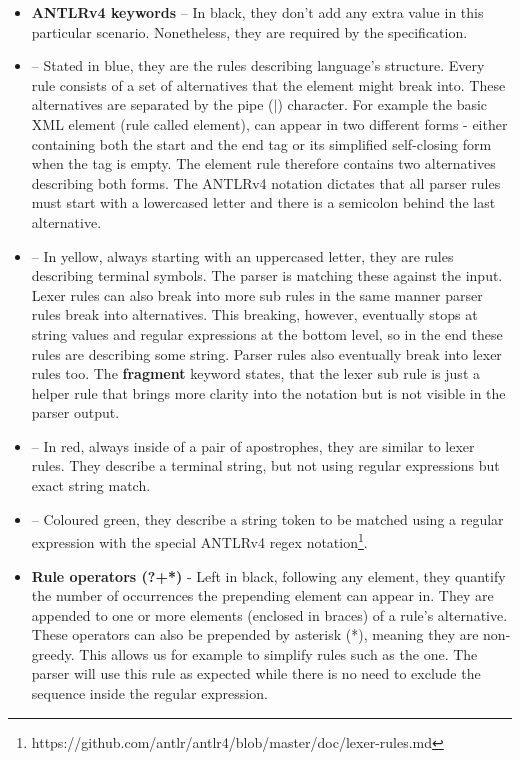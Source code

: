 \begin{itemize}
	\item \textbf{ANTLRv4 keywords} -- In black, they don't add any extra value in this particular scenario. Nonetheless, they are required by the specification.
	
	\item {} -- Stated in blue, they are the rules describing language's structure. Every rule consists of a set of alternatives that the element might break into. These alternatives are separated by the pipe ($|$) character. For example the basic XML element (rule called element), can appear in two different forms - either containing both the start and the end tag or its simplified self-closing form when the tag is empty. The element rule therefore contains two alternatives describing both forms. The ANTLRv4 notation dictates that all parser rules must start with a lowercased letter and there is a semicolon behind the last alternative.
	
	\item {} -- In yellow, always starting with an uppercased letter, they are rules describing terminal symbols. The parser is matching these against the input. Lexer rules can also break into more sub rules in the same manner parser rules break into alternatives. This breaking, however, eventually stops at string values and regular expressions at the bottom level, so in the end these rules are describing some string. Parser rules also eventually break into lexer rules too. The \textbf{fragment} keyword states, that the lexer sub rule is just a helper rule that brings more clarity into the notation but is not visible in the parser output.
	
	\item {} -- In red, always inside of a pair of apostrophes, they are similar to lexer rules. They describe a terminal string, but not using regular expressions but exact string match.
	
	\item {} -- Coloured green, they describe a string token to be matched using a regular expression with the special ANTLRv4 regex notation\footnote{https://github.com/antlr/antlr4/blob/master/doc/lexer-rules.md}.
	
	\item \textbf{Rule operators (?+*)} - Left in black, following any element, they quantify the number of occurrences the prepending element can appear in. They are appended to one or more elements (enclosed in braces) of a rule's alternative. These operators can also be prepended by asterisk (*), meaning they are non-greedy. This allows us for example to simplify rules such as the  one. The parser will use this rule as expected while there is no need to exclude the \literal{\texttt{]]>}} sequence inside the regular expression.
\end{itemize}